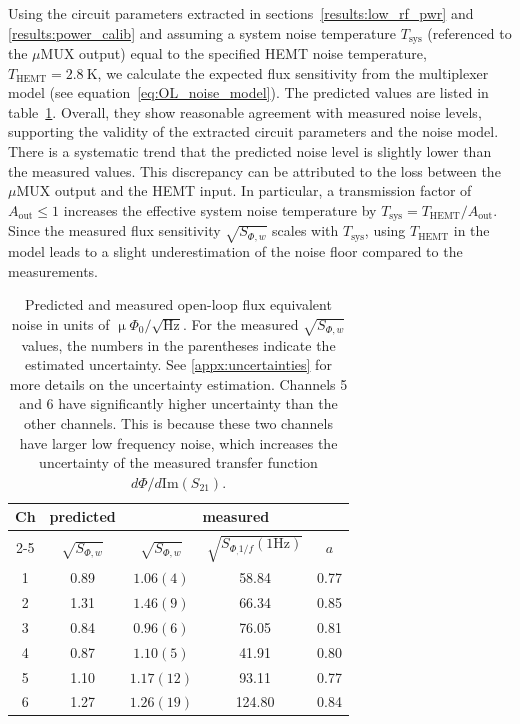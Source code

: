 \documentclass[10pt]{iopart}
\newcommand{\uMUX}{$\mu$MUX\xspace}
\newcommand{\uPhirtHz}{$\upmu \Phi_0/\sqrt{\text{Hz}}$\xspace}
\begin{document}
Using the circuit parameters extracted in sections~\ref{results:low_rf_pwr} and \ref{results:power_calib} and assuming a system noise temperature $T_{\text{sys}}$ (referenced to the \uMUX output) equal to the specified HEMT noise temperature, $T_{\text{HEMT}} = 2.8~\mathrm{K}$, we calculate the expected flux sensitivity from the multiplexer model (see equation~\eqref{eq:OL_noise_model}). The predicted values are listed in table~\ref{tab:open_loop_noise}. Overall, they show reasonable agreement with measured noise levels, supporting the validity of the extracted circuit parameters and the noise model. There is a systematic trend that the predicted noise level is slightly lower than the measured values. This discrepancy can be attributed to the loss between the \uMUX output and the HEMT input. In particular, a transmission factor of $A_{\text{out}} \le 1$ increases the effective system noise temperature by $T_{\text{sys}} = T_{\text{HEMT}}/A_{\text{out}}$. Since the measured flux sensitivity $\sqrt{S_{\Phi,w}}$ scales with $T_{\text{sys}}$, using $T_{\text{HEMT}}$ in the model leads to a slight underestimation of the noise floor compared to the measurements.


\begin{table}[htb]
    \centering
    \begin{tabular}{c c ccc}
    \hline
         \multirow{2}{*}{Ch} & predicted & \multicolumn{3}{c}{measured} \\
         \cline{2-5}
         & $\sqrt{S_{\Phi,w}}$ & $\sqrt{S_{\Phi,w}}$ & \small{$\sqrt{S_{\Phi_, 1/f} (1 \text{Hz})}$} & $a$ \\
    \hline
    1 & 0.89 & $1.06 (4)$ & 58.84 & 0.77\\
    2 & 1.31 & $1.46 (9)$ & 66.34 & 0.85\\
    3 & 0.84 & $0.96 (6)$ & 76.05 & 0.81\\
    4 & 0.87 & $1.10 (5)$ & 41.91 & 0.80\\
    5 & 1.10 & $1.17 (12)$ & 93.11 & 0.77\\
    6 & 1.27 & $1.26 (19)$ & 124.80 & 0.84\\
    \hline
    \end{tabular}
    \caption{Predicted and measured open-loop flux equivalent noise in units of \uPhirtHz. For the measured $\sqrt{S_{\Phi,w}}$ values, the numbers in the parentheses indicate the estimated uncertainty. See \ref{appx:uncertainties} for more details on the uncertainty estimation. Channels 5 and 6 have significantly higher uncertainty than the other channels. This is because these two channels have larger low frequency noise, which increases the uncertainty of the measured transfer function $d\Phi/d\mathrm{Im}(S_{21})$.}
    \label{tab:open_loop_noise}
\end{table}
\end{document}

